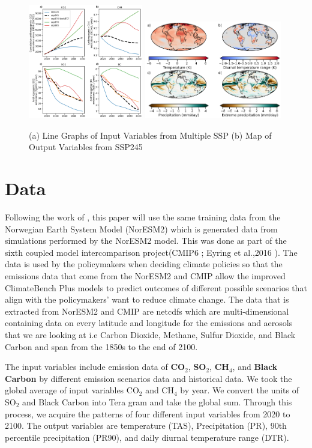 \documentclass{article} %
\begin{document}
\begin{figure}
    \centering
     {{\includegraphics[width=5cm]{figure/input.png} }}%
     \qquad
     {{\includegraphics[width=6cm]{figure/output.png} }}%
     \caption{(a) Line Graphs of Input Variables from Multiple SSP (b) Map of Output Variables from SSP245}%
     \label{fig:example}%
\end{figure}


\section{Data}
Following the work of \cite{watson2022climatebench}, this paper will use the same training data from the Norwegian Earth System Model (NorESM2) which is generated data from simulations performed by the NorESM2 model. This was done as part of the sixth coupled model intercomparison project(CMIP6 ; Eyring et al.,2016 ). The data is used by the policymakers when deciding climate policies so that the emissions data that come from the NorESM2 and CMIP allow the improved ClimateBench Plus models to predict outcomes of different possible scenarios that align with the policymakers' want to reduce climate change. The data that is extracted from NorESM2 and CMIP are netcdfs which are multi-dimensional containing data on every latitude and longitude for the emissions and aerosols that we are looking at i.e Carbon Dioxide, Methane, Sulfur Dioxide, and Black Carbon and span from the 1850s to the end of 2100. 

The input variables include emission data of \textbf{CO$_{2}$}, \textbf{SO$_{2}$}, \textbf{CH$_{4}$}, and \textbf{Black Carbon} by different emission scenarios data and historical data. We took the global average of input variables CO$_{2}$ and CH$_{4}$ by year. We convert the units of SO$_{2}$ and Black Carbon into Tera gram and take the global sum. Through this process, we acquire the patterns of four different input variables from 2020 to 2100. The output variables are temperature (TAS), Precipitation (PR), 90th percentile precipitation (PR90), and daily diurnal temperature range (DTR). 
\end{document}

